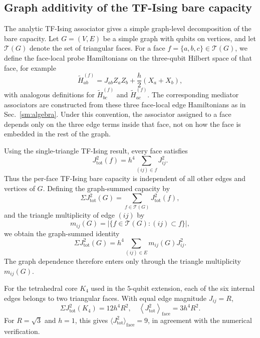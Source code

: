 \documentclass[aps,physrev,preprint,groupedaddress]{revtex4-2}
\begin{document}
\subsection{Graph additivity of the TF-Ising bare capacity}\label{sm:tfising-graph-additivity}
The analytic TF-Ising associator gives a simple graph-level decomposition of the bare capacity. Let $G=(V,E)$ be a simple graph with qubits on vertices, and let $\mathcal{T}(G)$ denote the set of triangular faces. For a face $f=\{a,b,c\}\in\mathcal{T}(G)$, we define
the face-local probe Hamiltonians on the three-qubit Hilbert space of that face, for example
\begin{equation}
    \tilde{H}^{(f)}_{ab} = J_{ab}Z_aZ_b+\frac{h}{2}(X_a+X_b),
\end{equation}
with analogous definitions for $\tilde H^{(f)}_{bc}$ and $\tilde H^{(f)}_{ac}$. The corresponding mediator associators are constructed from these three face-local edge Hamiltonians as in Sec.~\ref{sm:algebra}. Under this convention, the associator assigned to a face depends only on the three edge terms inside that face, not on how the face is embedded in the rest of the graph.

Using the single-triangle TF-Ising result, every face satisfies
\begin{equation}
    J_{\mathrm{tot}}^2(f) = h^4\sum_{(ij)\in f}J_{ij}^2 .
\end{equation}
Thus the per-face TF-Ising bare capacity is independent of all other edges and vertices of $G$. Defining the graph-summed capacity by
\begin{equation}
    \Sigma J_{\mathrm{tot}}^2(G) = \sum_{f\in\mathcal{T}(G)}J_{\mathrm{tot}}^2(f),
\end{equation}
and the triangle multiplicity of edge $(ij)$ by
\begin{equation}
    m_{ij}(G) = \lvert\{f\in\mathcal T(G):(ij)\subset{f}\}\rvert,
\end{equation}
we obtain the graph-summed identity
\begin{equation}
    \Sigma J_{\mathrm{tot}}^2(G) = h^4\sum_{(ij)\in E}m_{ij}(G)J_{ij}^2 .
\end{equation}
The graph dependence therefore enters only through the triangle multiplicity $m_{ij}(G)$.

For the tetrahedral core $K_4$ used in the $5$-qubit extension, each of the six internal edges belongs to two triangular faces. With equal edge magnitude $J_{ij}=R$,
\begin{equation}
    \Sigma J_{\mathrm{tot}}^2(K_4) = 12h^4R^2, \quad
    \left\langle J_{\mathrm{tot}}^2\right\rangle_{\mathrm{face}} = 3h^4R^2 .
\end{equation}
For $R=\sqrt3$ and $h=1$, this gives $\langle J_{\mathrm{tot}}^2\rangle_{\mathrm{face}}=9$, in agreement with the numerical verification.
\end{document}
